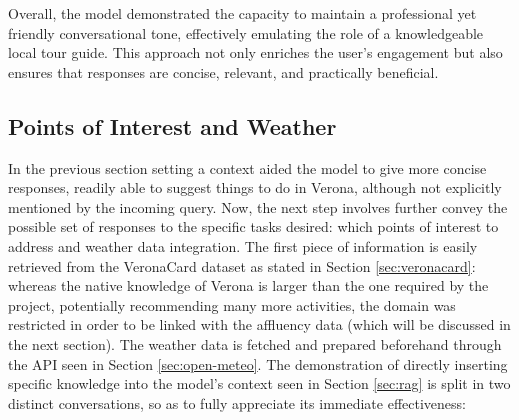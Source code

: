 Overall, the model demonstrated the capacity to maintain a professional yet friendly conversational tone, effectively emulating the role of a knowledgeable local tour guide. This approach not only enriches the user's engagement but also ensures that responses are concise, relevant, and practically beneficial.


\subsection{Points of Interest and Weather}
\label{sec:pois-weather}

In the previous section setting a context aided the model to give more concise responses, readily able to suggest things to do in Verona, although not explicitly mentioned by the incoming query. Now, the next step involves further convey the possible set of responses to the specific tasks desired: which points of interest to address and weather data integration. The first piece of information is easily retrieved from the VeronaCard dataset as stated in Section \ref{sec:veronacard}: whereas the native knowledge of Verona is larger than the one required by the project, potentially recommending many more activities, the domain was restricted in order to be linked with the affluency data (which will be discussed in the next section). The weather data is fetched and prepared beforehand through the API seen in Section \ref{sec:open-meteo}.
The demonstration of directly inserting specific knowledge into the model's context seen in Section \ref{sec:rag} is split in two distinct conversations, so as to fully appreciate its immediate effectiveness:

